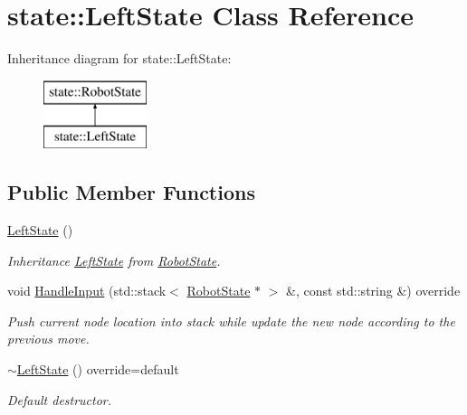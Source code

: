 \hypertarget{classstate_1_1_left_state}{}\section{state\+::Left\+State Class Reference}
\label{classstate_1_1_left_state}
Inheritance diagram for state\+::Left\+State\+:\begin{figure}[H]
\begin{center}
\leavevmode
\includegraphics[height=2.000000cm]{classstate_1_1_left_state}
\end{center}
\end{figure}
\subsection*{Public Member Functions}
\begin{DoxyCompactItemize}
\item 
\mbox{\label{classstate_1_1_left_state_add2610bcf8e15d0a5c23bfa0b13b4ecd}} 
\mbox{\hyperlink{classstate_1_1_left_state_add2610bcf8e15d0a5c23bfa0b13b4ecd}{Left\+State}} ()
\begin{DoxyCompactList}\small\item\em Inheritance \mbox{\hyperlink{classstate_1_1_left_state}{Left\+State}} from \mbox{\hyperlink{classstate_1_1_robot_state}{Robot\+State}}. \end{DoxyCompactList}\item 
\mbox{\label{classstate_1_1_left_state_a84a06ad4009e0522914889aebf0716d7}} 
void \mbox{\hyperlink{classstate_1_1_left_state_a84a06ad4009e0522914889aebf0716d7}{Handle\+Input}} (std\+::stack$<$ \mbox{\hyperlink{classstate_1_1_robot_state}{Robot\+State}} $\ast$ $>$ \&, const std\+::string \&) override
\begin{DoxyCompactList}\small\item\em Push current node location into stack while update the new node according to the previous move. \end{DoxyCompactList}\item 
\mbox{\label{classstate_1_1_left_state_a3377112636ad8e99a0910811209bf84c}} 
\mbox{\hyperlink{classstate_1_1_left_state_a3377112636ad8e99a0910811209bf84c}{$\sim$\+Left\+State}} () override=default
\begin{DoxyCompactList}\small\item\em Default destructor. \end{DoxyCompactList}\end{DoxyCompactItemize}


